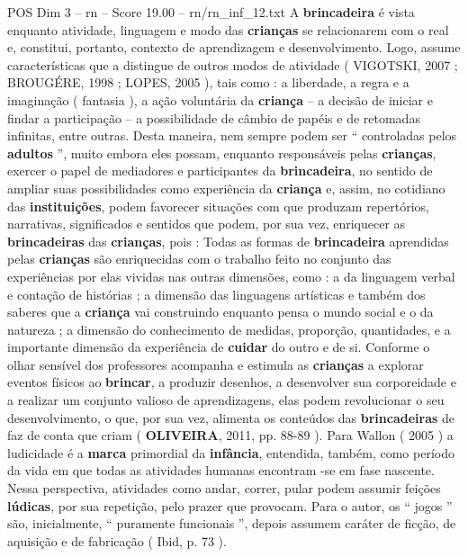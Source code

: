 \begin{textsample}{POS Dim 3 – rn – Score 19.00 – rn/rn\_inf\_12.txt}  \label{ex:f3_pos_099}
A \textbf{brincadeira} é vista enquanto atividade, linguagem e modo das \textbf{crianças} se relacionarem com o real e, constitui, portanto, contexto de aprendizagem e desenvolvimento.
Logo, assume características que a distingue de outros modos de atividade ( VIGOTSKI, 2007 ; BROUGÉRE, 1998 ; LOPES, 2005 ), tais como : a liberdade, a regra e a imaginação ( fantasia ), a ação voluntária da \textbf{criança} – a decisão de iniciar e findar a participação – a possibilidade de câmbio de papéis e de retomadas infinitas, entre outras.
Desta maneira, nem sempre podem ser “ controladas pelos \textbf{adultos} ”, muito embora eles possam, enquanto responsáveis pelas \textbf{crianças}, exercer o papel de mediadores e participantes da \textbf{brincadeira}, no sentido de ampliar suas possibilidades como experiência da \textbf{criança} e, assim, no cotidiano das \textbf{instituições}, podem favorecer situações com que produzam repertórios, narrativas, significados e sentidos que podem, por sua vez, enriquecer as \textbf{brincadeiras} das \textbf{crianças}, pois : Todas as formas de \textbf{brincadeira} aprendidas pelas \textbf{crianças} são enriquecidas com o trabalho feito no conjunto das experiências por elas vividas nas outras dimensões, como : a da linguagem verbal e contação de histórias ; a dimensão das linguagens artísticas e também dos saberes que a \textbf{criança} vai construindo enquanto pensa o mundo social e o da natureza ; a dimensão do conhecimento de medidas, proporção, quantidades, e a importante dimensão da experiência de \textbf{cuidar} do outro e de si.
Conforme o olhar sensível dos professores acompanha e estimula as \textbf{crianças} a explorar eventos físicos ao \textbf{brincar}, a produzir desenhos, a desenvolver sua corporeidade e a realizar um conjunto valioso de aprendizagens, elas podem revolucionar o seu desenvolvimento, o que, por sua vez, alimenta os conteúdos das \textbf{brincadeiras} de faz de conta que criam ( \textbf{OLIVEIRA}, 2011, pp. 88-89 ).
Para Wallon ( 2005 ) a ludicidade é a \textbf{marca} primordial da \textbf{infância}, entendida, também, como período da vida em que todas as atividades humanas encontram -se em fase nascente.
Nessa perspectiva, atividades como andar, correr, pular podem assumir feições \textbf{lúdicas}, por sua repetição, pelo prazer que provocam.
Para o autor, os “ jogos ” são, inicialmente, “ puramente funcionais ”, depois assumem caráter de ficção, de aquisição e de fabricação ( Ibid, p. 73 ).

\end{textsample}
